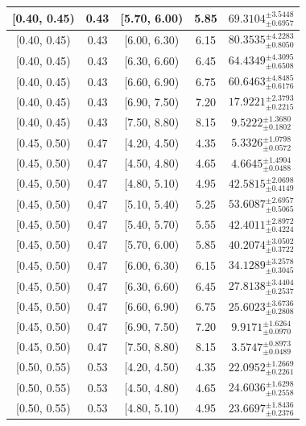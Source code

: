\begin{longtable}{|c|c|c|c|c|}
\hline
[0.40, 0.45) & 0.43 & [5.70, 6.00) & 5.85 & $69.3104^{ \pm 3.5448 }_{ \pm 0.6957 }$ \\ 
\hline
[0.40, 0.45) & 0.43 & [6.00, 6.30) & 6.15 & $80.3535^{ \pm 4.2283 }_{ \pm 0.8050 }$ \\ 
\hline
[0.40, 0.45) & 0.43 & [6.30, 6.60) & 6.45 & $64.4349^{ \pm 4.3095 }_{ \pm 0.6508 }$ \\ 
\hline
[0.40, 0.45) & 0.43 & [6.60, 6.90) & 6.75 & $60.6463^{ \pm 4.8485 }_{ \pm 0.6176 }$ \\ 
\hline
[0.40, 0.45) & 0.43 & [6.90, 7.50) & 7.20 & $17.9221^{ \pm 2.3793 }_{ \pm 0.2215 }$ \\ 
\hline
[0.40, 0.45) & 0.43 & [7.50, 8.80) & 8.15 & $9.5222^{ \pm 1.3680 }_{ \pm 0.1802 }$ \\ 
\hline
[0.45, 0.50) & 0.47 & [4.20, 4.50) & 4.35 & $5.3326^{ \pm 1.0798 }_{ \pm 0.0572 }$ \\ 
\hline
[0.45, 0.50) & 0.47 & [4.50, 4.80) & 4.65 & $4.6645^{ \pm 1.4904 }_{ \pm 0.0488 }$ \\ 
\hline
[0.45, 0.50) & 0.47 & [4.80, 5.10) & 4.95 & $42.5815^{ \pm 2.0698 }_{ \pm 0.4149 }$ \\ 
\hline
[0.45, 0.50) & 0.47 & [5.10, 5.40) & 5.25 & $53.6087^{ \pm 2.6957 }_{ \pm 0.5065 }$ \\ 
\hline
[0.45, 0.50) & 0.47 & [5.40, 5.70) & 5.55 & $42.4011^{ \pm 2.8972 }_{ \pm 0.4224 }$ \\ 
\hline
[0.45, 0.50) & 0.47 & [5.70, 6.00) & 5.85 & $40.2074^{ \pm 3.0502 }_{ \pm 0.3722 }$ \\ 
\hline
[0.45, 0.50) & 0.47 & [6.00, 6.30) & 6.15 & $34.1289^{ \pm 3.2578 }_{ \pm 0.3045 }$ \\ 
\hline
[0.45, 0.50) & 0.47 & [6.30, 6.60) & 6.45 & $27.8138^{ \pm 3.4404 }_{ \pm 0.2537 }$ \\ 
\hline
[0.45, 0.50) & 0.47 & [6.60, 6.90) & 6.75 & $25.6023^{ \pm 3.6736 }_{ \pm 0.2808 }$ \\ 
\hline
[0.45, 0.50) & 0.47 & [6.90, 7.50) & 7.20 & $9.9171^{ \pm 1.6264 }_{ \pm 0.0970 }$ \\ 
\hline
[0.45, 0.50) & 0.47 & [7.50, 8.80) & 8.15 & $3.5747^{ \pm 0.8973 }_{ \pm 0.0489 }$ \\ 
\hline
[0.50, 0.55) & 0.53 & [4.20, 4.50) & 4.35 & $22.0952^{ \pm 1.2669 }_{ \pm 0.2261 }$ \\ 
\hline
[0.50, 0.55) & 0.53 & [4.50, 4.80) & 4.65 & $24.6036^{ \pm 1.6298 }_{ \pm 0.2558 }$ \\ 
\hline
[0.50, 0.55) & 0.53 & [4.80, 5.10) & 4.95 & $23.6697^{ \pm 1.8436 }_{ \pm 0.2376 }$ \\ 

\end{longtable}
